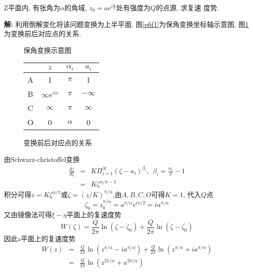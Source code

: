 \begin{problem}[问题6.6]
Z平面内, 有张角为$\alpha$的角域, $z_0=ae^{i\frac{\alpha}{2}}$处有强度为$Q$的点源, 求复速
度势.
\end{problem}

\begin{solution}
\textbf{解:} 利用倒解变化将该问题变换为上半平面, 图\ref{p6f1}为保角变换坐标轴示意图, 图\ref{p6f2}为变换前后对应点的关系.
\begin{figure}[!htb]
\begin{minipage}[b]{.65\textwidth}
\centering

\vspace{-0.25em}
\caption{\label{p6f1}保角变换示意图}
\end{minipage}%
\begin{minipage}[b]{.35\textwidth}
\centering
\begin{tabular}{l|lll}
\multicolumn{1}{c|}{} & \multicolumn{1}{c}{$z$} & \multicolumn{1}{c}{$\alpha_i$} & \multicolumn{1}{c}{$a_i$} \\
\hline
\multicolumn{1}{c|}{A} & \multicolumn{1}{c}{1} & \multicolumn{1}{c}{$\pi$} & \multicolumn{1}{c}{1} \\
\multicolumn{1}{c|}{B} & \multicolumn{1}{c}{$\infty e^{i\alpha}$} & \multicolumn{1}{c}{$\pi$} & \multicolumn{1}{c}{$-\infty$} \\
\multicolumn{1}{c|}{C} & \multicolumn{1}{c}{$\infty$} & \multicolumn{1}{c}{$\pi$} & \multicolumn{1}{c}{$\infty$} \\
\multicolumn{1}{c|}{O} & \multicolumn{1}{c}{0} & \multicolumn{1}{c}{$\alpha$} & \multicolumn{1}{c}{0} \\
\end{tabular}
\caption{\label{p6f2}变换前后对应点的关系}
\end{minipage}
\end{figure}

\noindent 由Schwarz-christoffel变换
\begin{eqnarray}
\frac{dz}{d\zeta} &=& K\Pi_{i=1}^N(\zeta-a_i)^{\beta_i}, {~~} \beta_i = \frac{\alpha_i}{\pi}-1\nonumber\\
&=& K\zeta^{\alpha/\pi-1}\nonumber
\end{eqnarray}
积分可得$z=K\zeta^{\alpha/\pi}$或$\zeta=(z/K)^{\pi/\alpha}$,由$A,B,C,O$可得$K=1$, 代入$Q$点
\[
\zeta_0 = z_0^{\pi/\alpha} = a^{\pi/\alpha}e^{i\pi/2} = ia^{\pi/\alpha}
\]
又由镜像法可得$\xi-\eta$平面上的复速度势
\[
W(\zeta) = \frac{Q}{2\pi}\ln(\zeta-\zeta_0) + \frac{Q}{2\pi}\ln(\zeta-\overline{\zeta_0})
\]
因此$z$平面上的复速度势
\begin{eqnarray}
W(z) &=& \frac{Q}{2\pi}\ln(z^{\pi/\alpha}-ia^{\pi/\alpha}) + \frac{Q}{2\pi}\ln(z^{\pi/\alpha}+ia^{\pi/\alpha})\nonumber\\
&=&\frac{Q}{2\pi}\ln(z^{2\pi/\alpha} + a^{2\pi/\alpha})\nonumber
\end{eqnarray}
\end{solution} 
